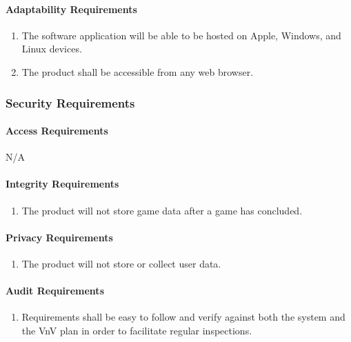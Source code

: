 \documentclass[12pt]{article}
\begin{document}
\paragraph{Adaptability Requirements}
\begin{enumerate}[{MS}1., leftmargin=2\parindent, resume]
    \item The software application will be able to be hosted on Apple, Windows, and Linux devices.
    \item The product shall be accessible from any web browser.
\end{enumerate}



\subsubsection{Security Requirements}
\label{NFR_SR}
\paragraph{Access Requirements}
N/A

\paragraph{Integrity Requirements}
\begin{enumerate}[{SR}1., leftmargin=2\parindent]
    \item The product will not store game data after a game has concluded.
\end{enumerate}

\paragraph{Privacy Requirements}
\begin{enumerate}[{SR}1., leftmargin=2\parindent, resume]
    \item The product will not store or collect user data.
\end{enumerate}

\paragraph{Audit Requirements}
\begin{enumerate}[{SR}1., leftmargin=2\parindent, resume]
    \item Requirements shall be easy to follow and verify against both the system and the VnV plan in order to facilitate regular inspections.
\end{enumerate}
\end{document}
